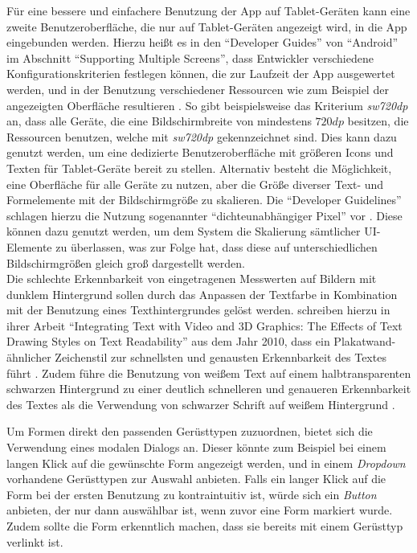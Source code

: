 Für eine bessere und einfachere Benutzung der App auf Tablet-Geräten kann eine zweite Benutzeroberfläche, die nur auf Tablet-Geräten angezeigt wird, in die App eingebunden werden. 
Hierzu heißt es in  den ``Developer Guides'' von ``Android'' im Abschnitt ``Supporting Multiple Screens'', dass Entwickler verschiedene Konfigurationskriterien festlegen können, die zur Laufzeit der App ausgewertet werden, und in der Benutzung verschiedener Ressourcen wie zum Beispiel der angezeigten Oberfläche resultieren \citep[How to Support Multiple Screens]{SS18}.
So gibt beispielsweise das Kriterium \emph{sw720dp} an, dass alle Geräte, die eine Bildschirmbreite von mindestens $720dp$ besitzen, die Ressourcen benutzen, welche mit \emph{sw720dp} gekennzeichnet sind.
Dies kann dazu genutzt werden, um eine dedizierte Benutzeroberfläche mit größeren Icons und Texten für Tablet-Geräte bereit zu stellen.
Alternativ besteht die Möglichkeit, eine Oberfläche für alle Geräte zu nutzen, aber die Größe diverser Text- und Formelemente mit der Bildschirmgröße zu skalieren.
Die ``Developer Guidelines'' schlagen hierzu die Nutzung sogenannter ``dichteunabhängiger Pixel'' vor \citep[Density Independence]{SS18}.
Diese können dazu genutzt werden, um dem System die Skalierung sämtlicher UI-Elemente zu überlassen, was zur Folge hat, dass diese auf unterschiedlichen Bildschirmgrößen gleich groß dargestellt werden.
\\

Die schlechte Erkennbarkeit von eingetragenen Messwerten auf Bildern mit dunklem Hintergrund sollen durch das Anpassen der Textfarbe in Kombination mit der Benutzung eines Texthintergrundes gelöst werden.
\citeauthor{Jankowski10} schreiben hierzu in ihrer Arbeit ``Integrating Text with Video and 3D Graphics: The Effects of Text Drawing Styles on Text Readability'' aus dem Jahr 2010, dass ein Plakatwand-ähnlicher Zeichenstil zur schnellsten und genausten Erkennbarkeit des Textes führt \citep[Seite 1330]{Jankowski10}.
Zudem führe die Benutzung von weißem Text auf einem halbtransparenten schwarzen Hintergrund zu einer deutlich schnelleren und genaueren Erkennbarkeit des Textes als die Verwendung von schwarzer Schrift auf weißem Hintergrund \citep[Seite 1328]{Jankowski10}.

Um Formen direkt den passenden Gerüsttypen zuzuordnen, bietet sich die Verwendung eines modalen Dialogs an.
Dieser könnte zum Beispiel bei einem langen Klick auf die gewünschte Form angezeigt werden, und in einem \emph{Dropdown} vorhandene Gerüsttypen zur Auswahl anbieten.
Falls ein langer Klick auf die Form bei der ersten Benutzung zu kontraintuitiv ist, würde sich ein \emph{Button} anbieten, der nur dann auswählbar ist, wenn zuvor eine Form markiert wurde.
Zudem sollte die Form erkenntlich machen, dass sie bereits mit einem Gerüsttyp verlinkt ist.

